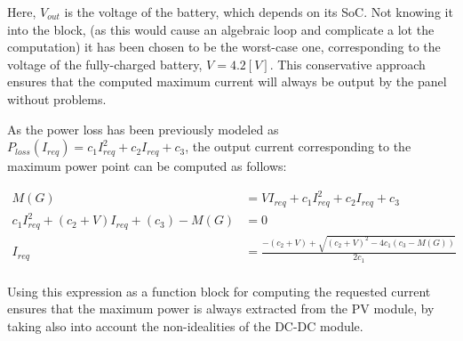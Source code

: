 Here, $V_{out}$ is the voltage of the battery, which depends on its SoC. Not knowing it into the block, (as this would cause an algebraic loop and complicate a lot the computation) it has been chosen to be the worst-case one, corresponding to the voltage of the fully-charged battery, $V=4.2 [V]$. This conservative approach ensures that the computed maximum current will always be output by the panel without problems.

As the power loss has been previously modeled as $P_{loss}(I_{req})=c_1I_{req}^2+c_2I_{req}+c_3$, the output current corresponding to the maximum power point can be computed as follows:

\begin{align*}
  M(G)&=VI_{req}+c_1I_{req}^2+c_2I_{req}+c_3 \\
  c_1I_{req}^2+(c_2+V) I_{req} + (c_3)-M(G) &= 0 \\
  I_{req} &= \frac{ -(c_2+V) + \sqrt{ (c_2+V)^2-4c_1(c_3 -M(G) )} }{2 c_1} \\
\end{align*}

Using this expression as a function block for computing the requested current ensures that the maximum power is always extracted from the PV module, by taking also into account the non-idealities of the DC-DC module.




